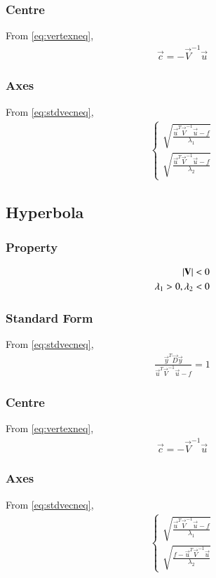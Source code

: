 \documentclass[journal,12pt,twocolumn]{IEEEtran}
\begin{document}
\subsubsection{Centre}
From \eqref{eq:vertexneq},
\begin{align}
    \vec{c} = -\vec{V}^{-1}\vec{u}
\end{align}
\subsubsection{Axes}
From \eqref{eq:stdvecneq},
\begin{align}
\begin{cases}
    \sqrt{\frac{\vec{u}^T\vec{V}^{-1}\vec{u}-f}{\lambda_1}}
    \\
    \sqrt{\frac{\vec{u}^T\vec{V}^{-1}\vec{u}-f}{\lambda_2}}
\end{cases}
\end{align}
\subsection{Hyperbola}

\subsubsection{Property}
\begin{align}
    \left\vert\mathbf{V}\right\vert < 0
    \\
    \lambda_1>0,\lambda_2<0
\end{align}
\subsubsection{Standard Form}
From \eqref{eq:stdvecneq},
\begin{align}
    \frac{\vec{y}^T\vec{D}\vec{y}}{\vec{u}^T\vec{V}^{-1}\vec{u}-f}=1
\end{align}
\subsubsection{Centre}
From \eqref{eq:vertexneq},
\begin{align}
    \vec{c} = -\vec{V}^{-1}\vec{u}
\end{align}
\subsubsection{Axes}
From \eqref{eq:stdvecneq},
\begin{align}
\begin{cases}
    \sqrt{\frac{\vec{u}^T\vec{V}^{-1}\vec{u}-f}{\lambda_1}}
    \\
    \sqrt{\frac{f-\vec{u}^T\vec{V}^{-1}\vec{u}}{\lambda_2}}
\end{cases}
\end{align}
\end{document}
